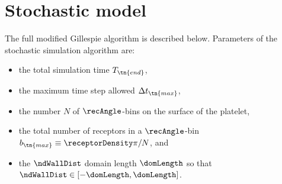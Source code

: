 \section{Stochastic model}
\label{sec:app-stochastic-model}

The full modified Gillespie algorithm is described below. Parameters
of the stochastic simulation algorithm are:
\begin{itemize}
\item the total simulation time $T_\tn{end}$,
\item the maximum time step allowed $\Delta t_\tn{max}$,
\item the number $N$ of $\recAngle$-bins on the surface of the
  platelet,
\item the total number of receptors in a $\recAngle$-bin $b_\tn{max}
  \equiv \receptorDensity \pi / N$, and
\item the $\ndWallDist$ domain length $\domLength$ so that
  $\ndWallDist \in [-\domLength, \domLength]$.
\end{itemize}

